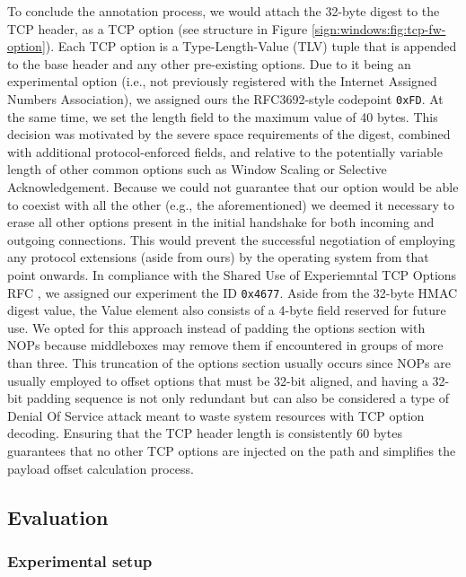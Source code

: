 To conclude the annotation process, we would attach the 32-byte digest to the TCP header, as a TCP option (see structure in Figure \ref{sign:windows:fig:tcp-fw-option}). Each TCP option is a Type-Length-Value (TLV) tuple that is appended to the base header and any other pre-existing options. Due to it being an experimental option (i.e., not previously registered with the Internet Assigned Numbers Association), we assigned ours the RFC3692-style \cite{rfc3692} codepoint \texttt{0xFD}. At the same time, we set the length field to the maximum value of 40 bytes. This decision was motivated by the severe space requirements of the digest, combined with additional protocol-enforced fields, and relative to the potentially variable length of other common options such as Window Scaling or Selective Acknowledgement. Because we could not guarantee that our option would be able to coexist with all the other (e.g., the aforementioned) we deemed it necessary to erase all other options present in the initial handshake for both incoming and outgoing connections. This would prevent the successful negotiation of employing any protocol extensions (aside from ours) by the operating system from that point onwards. In compliance with the Shared Use of Experiemntal TCP Options RFC \cite{rfc6994}, we assigned our experiment the ID \texttt{0x4677}. Aside from the 32-byte HMAC digest value, the Value element also consists of a 4-byte field reserved for future use. We opted for this approach instead of padding the options section with NOPs because middleboxes may remove them if encountered in groups of more than three. This truncation of the options section usually occurs since NOPs are usually employed to offset options that must be 32-bit aligned, and having a 32-bit padding sequence is not only redundant but can also be considered a type of Denial Of Service attack meant to waste system resources with TCP option decoding. Ensuring that the TCP header length is consistently 60 bytes guarantees that no other TCP options are injected on the path and simplifies the payload offset calculation process.

\subsection{Evaluation}
\label{sign:windows:evaluation}

\subsubsection{Experimental setup}
\label{sign:windows:evaluation:setup}

